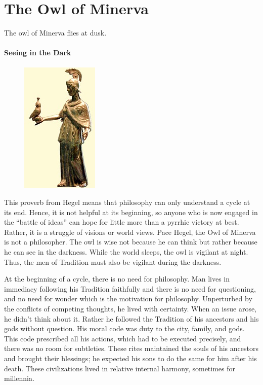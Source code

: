 \section{The Owl of Minerva}

\begin{quotex}
The owl of Minerva flies at dusk.

\end{quotex}
\paragraph{Seeing in the Dark}

\begin{figure}
\includegraphics[scale=.9]{a20110630TheOwlofMinerva-img001.jpg} 
\end{figure}

This proverb from Hegel means that philosophy can only understand a cycle at its end. Hence, it is not helpful at its beginning, so anyone who is now engaged in the “battle of ideas” can hope for little more than a pyrrhic victory at best. Rather, it is a struggle of visions or world views. Pace Hegel, the Owl of Minerva is not a philosopher. The owl is wise not because he can think but rather because he can see in the darkness. While the world sleeps, the owl is vigilant at night. Thus, the men of Tradition must also be vigilant during the darkness.


At the beginning of a cycle, there is no need for philosophy. Man lives in immediacy following his Tradition faithfully and there is no need for questioning, and no need for wonder which is the motivation for philosophy. Unperturbed by the conflicts of competing thoughts, he lived with certainty. When an issue arose, he didn't think about it. Rather he followed the Tradition of his ancestors and his gods without question. His moral code was duty to the city, family, and gods. This code prescribed all his actions, which had to be executed precisely, and there was no room for subtleties. These rites maintained the souls of his ancestors and brought their blessings; he expected his sons to do the same for him after his death. These civilizations lived in relative internal harmony, sometimes for millennia.

